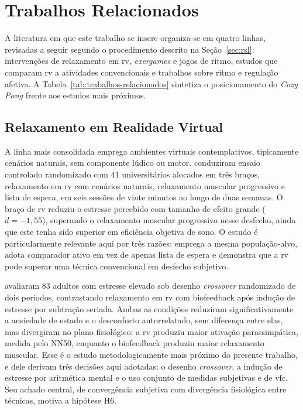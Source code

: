 \section{Trabalhos Relacionados}\label{sec:trabalhos-relacionados}

A literatura em que este trabalho se insere organiza-se em quatro linhas, revisadas a seguir segundo o procedimento descrito na Seção~\ref{sec:rsl}: intervenções de relaxamento em \gls{rv}, \textit{exergames} e jogos de ritmo, estudos que comparam \gls{rv} a atividades convencionais e trabalhos sobre ritmo e regulação afetiva. A Tabela~\ref{tab:trabalhos-relacionados} sintetiza o posicionamento do \textit{Cozy Pong} frente aos estudos mais próximos.

\subsection{Relaxamento em Realidade Virtual}\label{subsec:rel-rv}

A linha mais consolidada emprega ambientes virtuais contemplativos, tipicamente cenários naturais, sem componente lúdico ou motor. \citet{Ahn2025} conduziram ensaio controlado randomizado com $41$ universitários alocados em três braços, relaxamento em \gls{rv} com cenários naturais, relaxamento muscular progressivo e lista de espera, em seis sessões de vinte minutos ao longo de duas semanas. O braço de \gls{rv} reduziu o estresse percebido com tamanho de efeito grande ($d = -1{,}55$), superando o relaxamento muscular progressivo nesse desfecho, ainda que este tenha sido superior em eficiência objetiva de sono. O estudo é particularmente relevante aqui por três razões: emprega a mesma população-alvo, adota comparador ativo em vez de apenas lista de espera e demonstra que a \gls{rv} pode superar uma técnica convencional em desfecho subjetivo.

\citet{Kim2021} avaliaram $83$ adultos com estresse elevado sob desenho \textit{crossover} randomizado de dois períodos, contrastando relaxamento em \gls{rv} com biofeedback após indução de estresse por subtração seriada. Ambas as condições reduziram significativamente a ansiedade de estado e o desconforto autorrelatado, sem diferença entre elas, mas divergiram no plano fisiológico: a \gls{rv} produziu maior ativação parassimpática, medida pelo NN50, enquanto o biofeedback produziu maior relaxamento muscular. Esse é o estudo metodologicamente mais próximo do presente trabalho, e dele derivam três decisões aqui adotadas: o desenho \textit{crossover}, a indução de estresse por aritmética mental e o uso conjunto de medidas subjetivas e de \gls{vfc}. Seu achado central, de convergência subjetiva com divergência fisiológica entre técnicas, motiva a hipótese H6.

